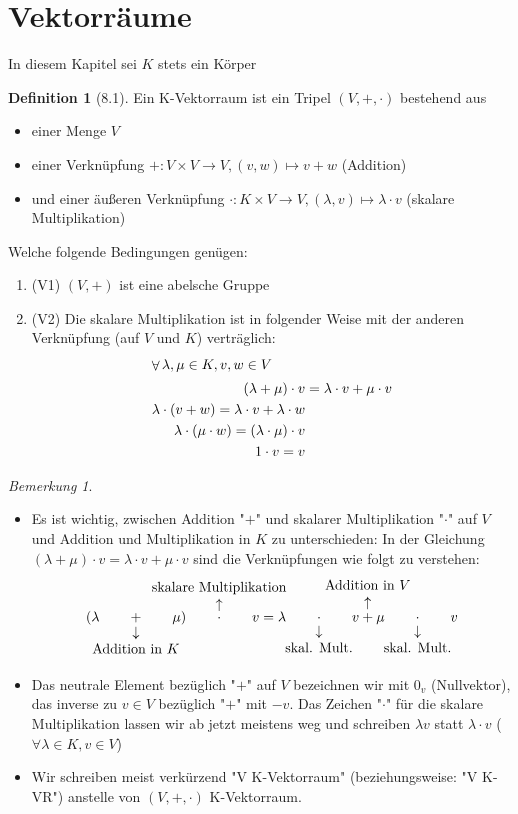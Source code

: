 \documentclass[a4paper]{scrartcl}
\DeclareMathOperator{\Forall}{\forall}
\theoremstyle{definition}
\newtheorem{defn}{Definition}
\theoremstyle{plain}
\theoremstyle{plain}
\theoremstyle{remark}
\newtheorem{remark}{Bemerkung}
\theoremstyle{remark}
\theoremstyle{remark}
\theoremstyle{remark}
\theoremstyle{remark}
\begin{document}
\section{Vektorräume}
\label{sec-5}
In diesem Kapitel sei $K$ stets ein Körper
\begin{defn}[8.1]
Ein K-Vektorraum ist ein Tripel $(V,+,\cdot)$ bestehend aus
\begin{itemize}
\item einer Menge $V$
\item einer Verknüpfung $+:V\times V \to V, (v,w)\mapsto v + w$ \hfill (Addition)
\item und einer äußeren Verknüpfung $\cdot : K\times V \to V, (\lambda,v) \mapsto \lambda \cdot v$ \hfill (skalare Multiplikation)
\end{itemize}
Welche folgende Bedingungen genügen:
\begin{enumerate}
\item (V1) $(V,+)$ ist eine abelsche Gruppe
\item (V2) Die skalare Multiplikation ist in folgender Weise mit der anderen Verknüpfung (auf $V$ und $K$) verträglich:
\begin{align*}
\intertext{$\Forall \lambda,\mu \in K, v,w\in V$}
(\lambda + \mu) \cdot v  &= \lambda \cdot v + \mu \cdot v \\
\lambda \cdot (v + w) = \lambda \cdot v + \lambda \cdot w \\
\lambda \cdot (\mu \cdot w) = (\lambda \cdot \mu) \cdot v \\
1\cdot v = v
\end{align*}
\end{enumerate}
\end{defn}
\begin{remark}
\begin{itemize}
\item Es ist wichtig, zwischen Addition "$+$" und skalarer Multiplikation "$\cdot$" auf $V$ und Addition und Multiplikation in $K$ zu unterschieden:
In der Gleichung $(\lambda + \mu) \cdot v = \lambda \cdot v + \mu\cdot v$ sind die Verknüpfungen wie folgt zu verstehen:
\[(\lambda \qquad\underarrow[+]{Addition in $K$}\qquad \mu) \qquad \overarrow[\cdot]{skalare Multiplikation} \qquad v = \lambda \qquad \underarrow[\cdot]{skal. Mult.} \qquad v \overarrow[+]{Addition in $V$} \mu\qquad\underarrow[\cdot]{skal. Mult.} \qquad v\]
\item Das neutrale Element bezüglich "$+$" auf $V$ bezeichnen wir mit $0_v$ (Nullvektor), das inverse zu $v\in V$ bezüglich "$+$" mit $-v$. Das Zeichen "$\cdot$" für die skalare Multiplikation lassen wir ab jetzt meistens weg und schreiben $\lambda v$ statt $\lambda\cdot v$ ($\Forall \lambda\in K, v\in V$)
\item Wir schreiben meist verkürzend "V K-Vektorraum" (beziehungsweise: "V K-VR") anstelle von $(V,+,\cdot)$ K-Vektorraum.
\end{itemize}
\end{remark}
\end{document}
